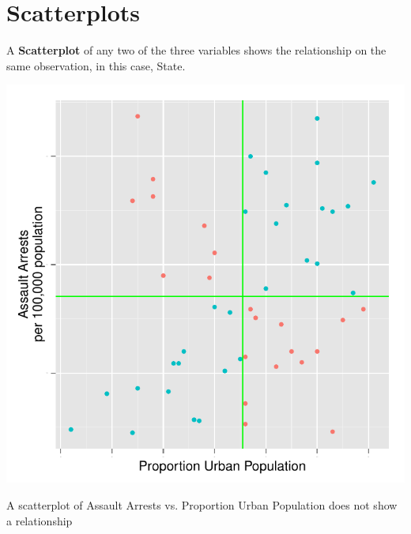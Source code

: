 \documentclass[nohyper,justified]{tufte-handout}\usepackage[]{graphicx}\usepackage[]{color}
\makeatletter
\def\maxwidth{ %
  \ifdim\Gin@nat@width>\linewidth
    \linewidth
  \else
    \Gin@nat@width
  \fi
}
\newenvironment{knitrout}{}{} %
\makeatother
\begin{document}
\newpage
\section{Scatterplots}
A \textbf{Scatterplot} of any two of the three variables shows the relationship on the same observation, in this case, State. 
\begin{knitrout}
\color{fgcolor}\begin{marginfigure}

{\centering \includegraphics[width=\maxwidth]{figure/graphics-scatterplotsxz-1} 

}

\caption[A scatterplot of Assault Arrests vs]{A scatterplot of Assault Arrests vs. Proportion Urban Population does not show a relationship}\label{fig:scatterplotsxz}
\end{marginfigure}


\end{knitrout}
\end{document}
